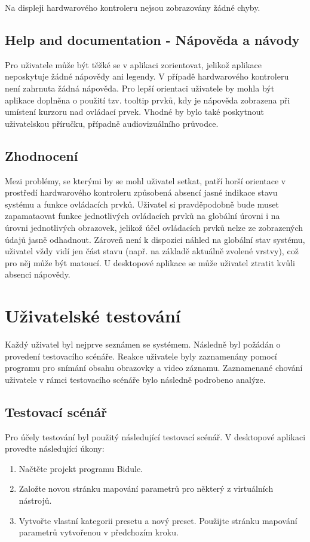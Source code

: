 \documentclass[thesis=M,czech]{FITthesis}[2019/03/06]
\begin{document}
			Na displeji hardwarového kontroleru nejsou zobrazovány žádné chyby.

		\subsection{Help and documentation - Nápověda a návody}
			Pro uživatele může být těžké se v aplikaci zorientovat, jelikož aplikace neposkytuje žádné nápovědy ani legendy. V případě hardwarového kontroleru není zahrnuta žádná nápověda. 
			Pro lepší orientaci uživatele by mohla být aplikace doplněna o použití tzv. tooltip prvků, kdy je nápověda zobrazena při umístení kurzoru nad ovládací prvek.
			Vhodné by bylo také poskytnout uživatelskou příručku, případně audiovizuálního průvodce.
			
		\subsection{Zhodnocení}
			Mezi problémy, se kterými by se mohl uživatel setkat, patří horší orientace v prostředí hardwarového kontroleru způsobená
			 absencí jasné indikace stavu systému a funkce ovládacích prvků. Uživatel si pravděpodobně bude muset zapamataovat funkce jednotlivých ovládacích prvků na globální úrovni i na úrovni jednotlivých obrazovek, jelikož účel ovládacích prvků nelze ze zobrazených údajů jasně odhadnout.
			Zároveň není k dispozici náhled na globální stav systému, uživatel vždy vidí jen část stavu (např. na základě aktuálně zvolené vrstvy), což pro něj může být matoucí.
			U desktopové aplikace se může uživatel ztratit kvůli absenci nápovědy.
		
	\section{Uživatelské testování}
		Každý uživatel byl nejprve seznámen se systémem. Následně byl požádán o provedení testovacího scénáře. Reakce uživatele byly zaznamenány pomocí programu pro snímání obsahu obrazovky a video záznamu. Zaznamenané chování uživatele v rámci testovacího scénáře bylo následně podrobeno analýze.
	
		\subsection{Testovací scénář}
			Pro účely testování byl použitý následující testovací scénář.
			\bigbreak
			\noindent 
			V desktopové aplikaci proveďte následující úkony:
			\begin{enumerate}
				\item Načtěte projekt programu Bidule.
				\item Založte novou stránku mapování parametrů pro některý z virtuálních nástrojů.
				\item Vytvořte vlastní kategorii presetu a nový preset. Použijte stránku mapování parametrů vytvořenou v předchozím kroku.
			\end{enumerate}
				
\end{document}

